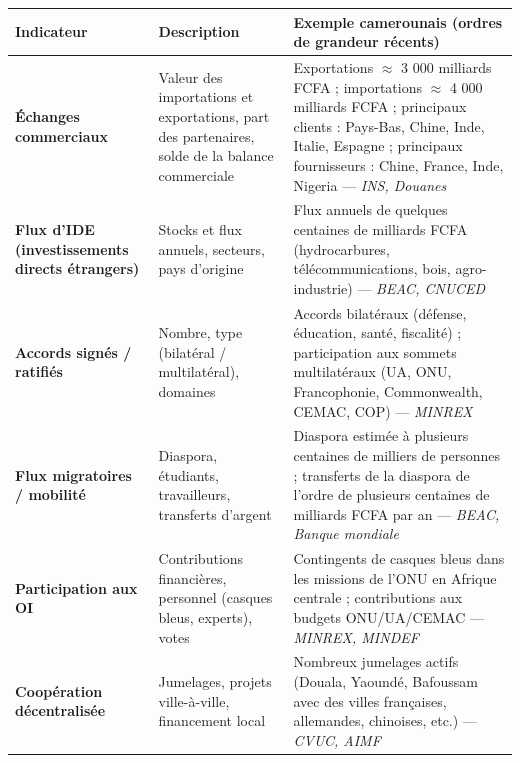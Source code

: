 \documentclass[11pt]{article}
\begin{document}
\begin{center}
\begin{tabularx}{\linewidth}{|l|X|X|}
\hline
\rowcolor{popblueL}
\textbf{Indicateur} & \textbf{Description} & \textbf{Exemple camerounais (ordres de grandeur récents)} \\
\hline
\textbf{Échanges commerciaux} & Valeur des importations et exportations, part des partenaires, solde de la balance commerciale & Exportations $\approx$ 3 000 milliards FCFA ; importations $\approx$ 4 000 milliards FCFA ; principaux clients : Pays-Bas, Chine, Inde, Italie, Espagne ; principaux fournisseurs : Chine, France, Inde, Nigeria — \emph{INS, Douanes} \\
\hline
\textbf{Flux d'IDE (investissements directs étrangers)} & Stocks et flux annuels, secteurs, pays d'origine & Flux annuels de quelques centaines de milliards FCFA (hydrocarbures, télécommunications, bois, agro-industrie) — \emph{BEAC, CNUCED} \\
\hline
\textbf{Accords signés / ratifiés} & Nombre, type (bilatéral / multilatéral), domaines & Accords bilatéraux (défense, éducation, santé, fiscalité) ; participation aux sommets multilatéraux (UA, ONU, Francophonie, Commonwealth, CEMAC, COP) — \emph{MINREX} \\
\hline
\textbf{Flux migratoires / mobilité} & Diaspora, étudiants, travailleurs, transferts d'argent & Diaspora estimée à plusieurs centaines de milliers de personnes ; transferts de la diaspora de l'ordre de plusieurs centaines de milliards FCFA par an — \emph{BEAC, Banque mondiale} \\
\hline
\textbf{Participation aux OI} & Contributions financières, personnel (casques bleus, experts), votes & Contingents de casques bleus dans les missions de l'ONU en Afrique centrale ; contributions aux budgets ONU/UA/CEMAC — \emph{MINREX, MINDEF} \\
\hline
\textbf{Coopération décentralisée} & Jumelages, projets ville-à-ville, financement local & Nombreux jumelages actifs (Douala, Yaoundé, Bafoussam avec des villes françaises, allemandes, chinoises, etc.) — \emph{CVUC, AIMF} \\
\hline
\end{tabularx}
\end{center}
\end{document}
